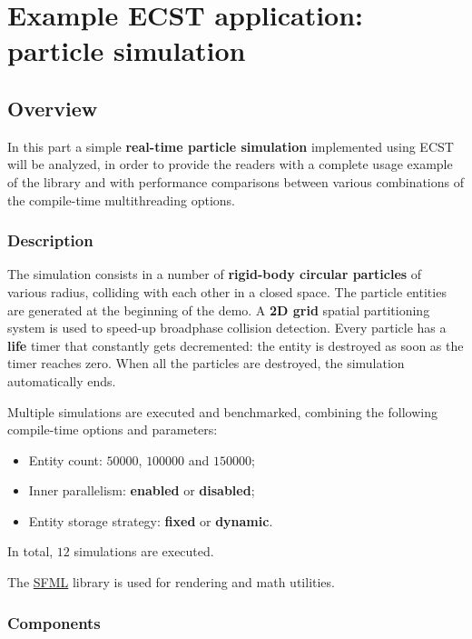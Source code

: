 \documentclass[twoside, 12pt, a4paper, openright]{book}
\begin{document}
\part{Example ECST application: particle simulation}

\hypertarget{part3_sim}{\chapter{Overview}\label{part3_sim}}

In this part a simple \textbf{real-time particle simulation} implemented
using ECST will be analyzed, in order to provide the readers with a
complete usage example of the library and with performance comparisons
between various combinations of the compile-time multithreading options.

\section{Description}\label{description}

The simulation consists in a number of \textbf{rigid-body circular
particles} of various radius, colliding with each other in a closed
space. The particle entities are generated at the beginning of the demo.
A \textbf{2D grid} spatial partitioning system is used to speed-up
broadphase collision detection. Every particle has a \textbf{life} timer
that constantly gets decremented: the entity is destroyed as soon as the
timer reaches zero. When all the particles are destroyed, the simulation
automatically ends.

Multiple simulations are executed and benchmarked, combining the
following compile-time options and parameters:

\begin{itemize}
\item
  Entity count: \(50000\), \(100000\) and \(150000\);
\item
  Inner parallelism: \textbf{enabled} or \textbf{disabled};
\item
  Entity storage strategy: \textbf{fixed} or \textbf{dynamic}.
\end{itemize}

In total, \(12\) simulations are executed.

The \href{http://sfml-dev.org}{SFML} library is used for rendering and
math utilities.

\section{Components}\label{components}
\end{document}
